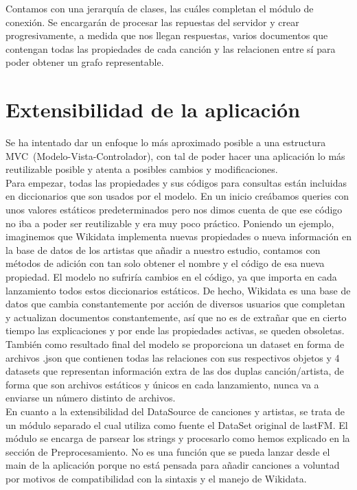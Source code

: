 Contamos con una jerarquía de clases, las cuáles completan el módulo de conexión. Se encargarán de procesar las repuestas del servidor y crear progresivamente, a medida que nos llegan respuestas, varios documentos que contengan todas las propiedades de cada canción y las relacionen entre sí para poder obtener un grafo representable.\\

\section{Extensibilidad de la aplicación}

Se ha intentado dar un enfoque lo más aproximado posible a una estructura MVC~(Modelo-Vista-Controlador), con tal de poder hacer una aplicación lo más reutilizable posible y atenta a posibles cambios y modificaciones.\\

Para empezar, todas las propiedades y sus códigos para consultas están incluidas en diccionarios que son usados por el modelo. En un inicio creábamos queries con unos valores estáticos predeterminados pero nos dimos cuenta de que ese código no iba a poder ser reutilizable y era muy poco práctico. Poniendo un ejemplo, imaginemos que Wikidata implementa nuevas propiedades o nueva información en la base de datos de los artistas que añadir a nuestro estudio, contamos con métodos de adición con tan solo obtener el nombre y el código de esa nueva propiedad. El modelo no sufriría cambios en el código, ya que importa en cada lanzamiento todos estos diccionarios estáticos. De hecho, Wikidata es una base de datos que cambia constantemente por acción de diversos usuarios que completan y actualizan documentos constantemente, así que no es de extrañar que en cierto tiempo las explicaciones y por ende las propiedades activas, se queden obsoletas.\\

También como resultado final del modelo se proporciona un dataset en forma de archivos .json que contienen todas las relaciones con sus respectivos objetos y 4 datasets que representan información extra de las dos duplas canción/artista, de forma que son archivos estáticos y únicos en cada lanzamiento, nunca va a enviarse un número distinto de archivos.\\

En cuanto a la extensibilidad del DataSource de canciones y artistas, se trata de un módulo separado el cual utiliza como fuente el DataSet original de lastFM. El módulo se encarga de parsear los strings y procesarlo como hemos explicado en la sección de Preprocesamiento. No es una función que se pueda lanzar desde el main de la aplicación porque no está pensada para añadir canciones a voluntad por motivos de compatibilidad con la sintaxis y el manejo de Wikidata.\\

